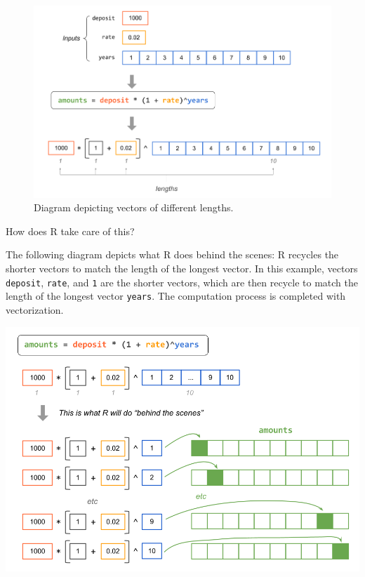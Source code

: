 \documentclass[
]{book}
\begin{document}
\begin{figure}

{\centering \includegraphics[width=0.9\linewidth]{images/vectors/vectorized1} 

}

\caption{Diagram depicting vectors of different lengths.}\label{fig:unnamed-chunk-77}
\end{figure}

How does R take care of this?

The following diagram depicts what R does behind the scenes: R recycles the
shorter vectors to match the length of the longest vector. In this example,
vectors \texttt{deposit}, \texttt{rate}, and \texttt{1} are the shorter vectors, which are then
recycle to match the length of the longest vector \texttt{years}. The computation
process is completed with vectorization.

\begin{center}\includegraphics[width=0.9\linewidth]{images/vectors/vectorized2} \end{center}
\end{document}
